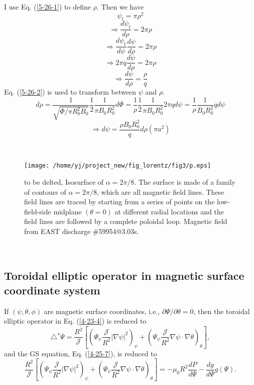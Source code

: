 \documentclass{llncs}
\begin{document}
I use Eq. (\ref{5-26-1}) to define $\rho$. Then we have
\begin{equation}
  \psi_t = \pi \rho^2
\end{equation}
\begin{equation}
  \Longrightarrow \frac{d \psi_t}{d \rho} = 2 \pi \rho
\end{equation}
\begin{equation}
  \Longrightarrow \frac{d \psi_t}{d \psi}  \frac{d \psi}{d \rho} = 2 \pi \rho
\end{equation}
\begin{equation}
  \Longrightarrow 2 \pi q \frac{d \psi}{d \rho} = 2 \pi \rho
\end{equation}
\begin{equation}
  \label{5-26-2} \Longrightarrow \frac{d \psi}{d \rho} = \frac{\rho}{q}
\end{equation}
Eq. (\ref{5-26-2}) is used to transform between $\psi$ and $\rho$.
\[ d \rho = \frac{1}{\sqrt{\Phi / \pi R_0^2 B_0}} \frac{1}{2} \frac{1}{\pi B_0
   R_0^2} d \Phi = \frac{1}{\rho} \frac{1}{2} \frac{1}{\pi B_0 R_0^2} 2 \pi q
   d \psi = \frac{1}{\rho} \frac{1}{B_0 R_0^2} q d \psi \]
\[ \Rightarrow d \psi = \frac{\rho B_0 R_0^2}{q} d \rho (\pi a^2) \]


\

\begin{figure}[h]
  \texttt{[image: /home/yj/project\_new/fig\_lorentz/fig3/p.eps]}
  \caption{to be delted, Isosurface of $\alpha = 2 \pi / 8$. The surface is
  made of a family of contours of $\alpha = 2 \pi / 8$, which are all magnetic
  field lines. These field lines are traced by starting from a series of
  points on the low-field-side midplane $(\theta = 0)$ at different radial
  locations and the field lines are followed by a complete poloidal loop.
  Magnetic field from EAST discharge \#59954@3.03s.}
\end{figure}

\

\subsection{Toroidal elliptic operator in magnetic surface coordinate
system}\label{4-25-9}

If $(\psi, \theta, \phi)$ are magnetic surface coordinates, i.e., $\partial
\Psi / \partial \theta = 0$, then the toroidal elliptic operator in Eq.
(\ref{4-23-4}) is reduced to
\begin{equation}
  \triangle^{\star} \Psi = \frac{R^2}{\mathcal{J}} \left[ \left( \Psi_{\psi}
  \frac{\mathcal{J}}{R^2} | \nabla \psi |^2 \right)_{\psi} + \left(
  \Psi_{\psi} \frac{\mathcal{J}}{R^2} \nabla \psi \cdot \nabla \theta
  \right)_{\theta} \right],
\end{equation}
and the GS equation, Eq. (\ref{4-25-7}), is reduced to
\begin{equation}
  \label{9-28-e1} \frac{R^2}{\mathcal{J}} \left[ \left( \Psi_{\psi}
  \frac{\mathcal{J}}{R^2} | \nabla \psi |^2 \right)_{\psi} + \left(
  \Psi_{\psi} \frac{\mathcal{J}}{R^2} \nabla \psi \cdot \nabla \theta
  \right)_{\theta} \right] = - \mu_0 R^2 \frac{d P}{d \Psi} - \frac{d g}{d
  \Psi} g (\Psi) .
\end{equation}
\end{document}
